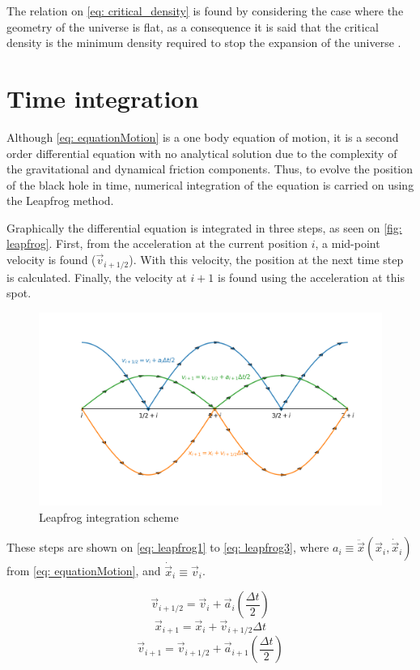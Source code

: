 	The relation on \autoref{eq: critical_density} is found by considering the case where the geometry of the universe is flat, as a consequence it is said that the critical density is the minimum density required to stop the expansion of the universe \cite{binney2011galactic}.
	
\chapter{Time integration}
	Although \autoref{eq: equationMotion} is a one body equation of motion, it is a second order differential equation with no analytical solution due to the complexity of the gravitational and dynamical friction components. Thus, to evolve the position of the black hole in time, numerical integration of the equation is carried on using the Leapfrog method.
	
	Graphically the differential equation is integrated in three steps, as seen on \autoref{fig: leapfrog}. First, from the acceleration at the current position $i$, a mid-point velocity is found ($\vec{v}_{i + 1/2}$). With this velocity, the position at the next time step is calculated. Finally, the velocity at $i + 1$ is found using the acceleration at this spot.	
	\begin{figure}[h]
		\centering
		\includegraphics[width = 0.8\linewidth]{"../Files/Week 13/leapfrog"}
		\caption{Leapfrog integration scheme}
		\label{fig: leapfrog}
	\end{figure}

	These steps are shown on \autoref{eq: leapfrog1} to \autoref{eq: leapfrog3}, where $a_i \equiv \ddot{\vec{x}}(\vec{x}_i, \dot{\vec{x}}_i)$ from \autoref{eq: equationMotion}, and $\dot{\vec{x}}_i \equiv \vec{v}_i$.
	
	\begin{equation}\label{eq: leapfrog1}
		\vec{v}_{i+1/2} = \vec{v}_i + \vec{a}_i\left(\dfrac{\Delta t}{2}\right)
	\end{equation}
	\begin{equation}
		\vec{x}_{i+1} = \vec{x}_i + \vec{v}_{i+1/2}\Delta t
	\end{equation}
	\begin{equation}\label{eq: leapfrog3}
		\vec{v}_{i+1} = \vec{v}_{i+1/2}+\vec{a}_{i+1}\left(\dfrac{\Delta t}{2}\right)
	\end{equation}
	
